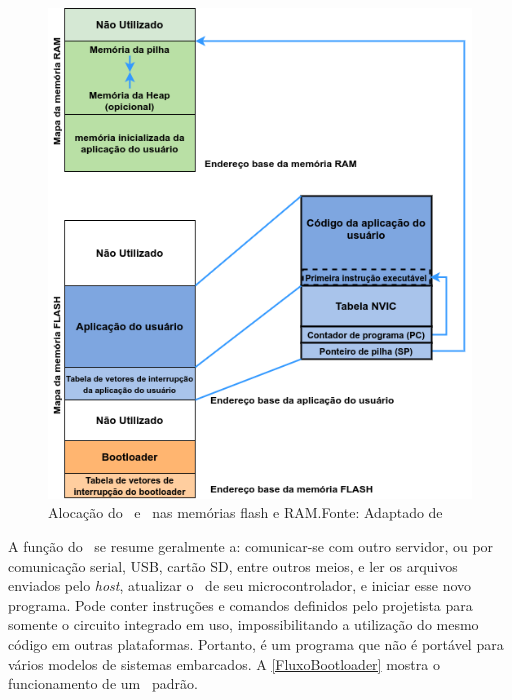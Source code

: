 \begin{figure}[H]
    \scriptsize
     \centering
     \includegraphics[scale=0.7]{dados/figuras/DiagBootloaderOriginal.png}
     \caption{Alocação do \bootloader\ e \firmware\ nas memórias flash e RAM.\newline Fonte: Adaptado de \cite{DavesDurlin2013}}
     \label{Diag_Bootloader}
\end{figure}

A função do \bootloader\ se resume geralmente a: comunicar-se com outro servidor, ou por comunicação serial, USB, cartão SD, entre outros meios, e ler os arquivos enviados pelo \textit{host}, atualizar o \firmware\ de seu microcontrolador, e iniciar esse novo programa. 
Pode conter instruções e comandos definidos pelo projetista para somente o circuito integrado em uso, impossibilitando a utilização do mesmo código em outras plataformas.
Portanto, é um programa que não é portável para vários modelos de sistemas embarcados. A \autoref{FluxoBootloader} mostra o funcionamento de um \bootloader\ padrão. 

